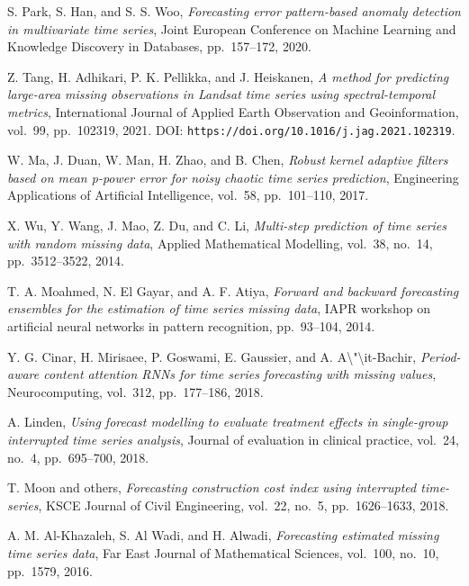 \begin{enumerate}[label={[S\arabic*]}]
    \item %
    S. Park, S. Han, and S. S. Woo, \textit{Forecasting error pattern-based anomaly detection in multivariate time series}, Joint European Conference on Machine Learning and Knowledge Discovery in Databases, pp.~157–172, 2020.
    \item %
    Z. Tang, H. Adhikari, P. K. Pellikka, and J. Heiskanen, \textit{A method for predicting large-area missing observations in Landsat time series using spectral-temporal metrics}, International Journal of Applied Earth Observation and Geoinformation, vol.~99, pp.~102319, 2021. DOI: \texttt{https://doi.org/10.1016/j.jag.2021.102319}.
    \item %
    W. Ma, J. Duan, W. Man, H. Zhao, and B. Chen, \textit{Robust kernel adaptive filters based on mean p-power error for noisy chaotic time series prediction}, Engineering Applications of Artificial Intelligence, vol.~58, pp.~101–110, 2017.
    \item %
    X. Wu, Y. Wang, J. Mao, Z. Du, and C. Li, \textit{Multi-step prediction of time series with random missing data}, Applied Mathematical Modelling, vol.~38, no.~14, pp.~3512–3522, 2014.
    \item %
    T. A. Moahmed, N. El Gayar, and A. F. Atiya, \textit{Forward and backward forecasting ensembles for the estimation of time series missing data}, IAPR workshop on artificial neural networks in pattern recognition, pp.~93–104, 2014.
    \item %
    Y. G. Cinar, H. Mirisaee, P. Goswami, E. Gaussier, and A. A\textbackslash{}"\textbackslash{}it-Bachir, \textit{Period-aware content attention RNNs for time series forecasting with missing values}, Neurocomputing, vol.~312, pp.~177–186, 2018.
    \item %
    A. Linden, \textit{Using forecast modelling to evaluate treatment effects in single-group interrupted time series analysis}, Journal of evaluation in clinical practice, vol.~24, no.~4, pp.~695–700, 2018.
    \item %
    T. Moon and others, \textit{Forecasting construction cost index using interrupted time-series}, KSCE Journal of Civil Engineering, vol.~22, no.~5, pp.~1626–1633, 2018.
    \item %
    A. M. Al-Khazaleh, S. Al Wadi, and H. Alwadi, \textit{Forecasting estimated missing time series data}, Far East Journal of Mathematical Sciences, vol.~100, no.~10, pp.~1579, 2016.

\end{enumerate}
